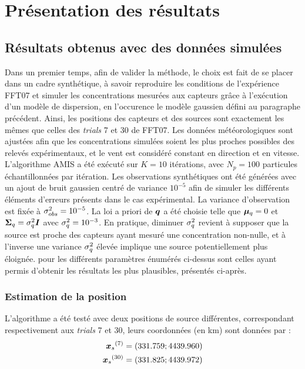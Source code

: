 \section{Présentation des résultats}

\subsection{Résultats obtenus avec des données simulées}
\label{par_simule}

Dans un premier temps, afin de valider la méthode, le choix est fait de se placer dans un cadre synthétique, à savoir reproduire les conditions de l'expérience FFT07 et simuler les concentrations mesurées aux capteurs grâce à l'exécution d'un modèle de dispersion, en l'occurence le modèle gaussien défini au paragraphe précédent. Ainsi, les positions des capteurs et des sources sont exactement les mêmes que celles des \textit{trials} 7 et 30 de FFT07. Les données météorologiques sont ajustées afin que les concentrations simulées soient les plus proches possibles des relevés expérimentaux, et le vent est considéré constant en direction et en vitesse. \\

L'algorithme AMIS a été exécuté sur $K = 10$ itérations, avec $N_p = 100$ particules échantillonnées par itération.  Les observations synthétiques ont été générées avec un ajout de bruit gaussien centré de variance $10^{-5}$ afin de simuler les différents éléments d'erreurs présents dans le cas expérimental. La variance d'observation est fixée à ${\sigma_{obs}^2} = 10^{-5}$. La loi a priori de ${\bm{q}}$ a été choisie telle que ${\bm{\mu}_q} = 0$ et ${\bm{\Sigma}_q} = \sigma_q^2 \bm{I}$ avec $\sigma_q^2 = 10^{-3}$. En pratique, diminuer $\sigma_q^2$ revient à supposer  que la source est proche des capteurs ayant mesuré une concentration non-nulle, et à l'inverse une variance $\sigma_q^2$ élevée implique une source potentiellement plus éloignée. 
 pour les différents paramètres énumérés ci-dessus sont celles ayant permis d'obtenir les résultats les plus plausibles, présentés ci-après. \\

\subsubsection{Estimation de la position}

L'algorithme a été testé avec deux positions de source différentes, correspondant respectivement aux \textit{trials} 7 et 30, leurs coordonnées (en km) sont données par : 
\begin{equation}
\begin{split}
{\bm{x}_s}^{(7)} &= (331.759;4439.960) \\
{\bm{x}_s}^{(30)} &= (331.825;4439.972)
\end{split}
\end{equation}

